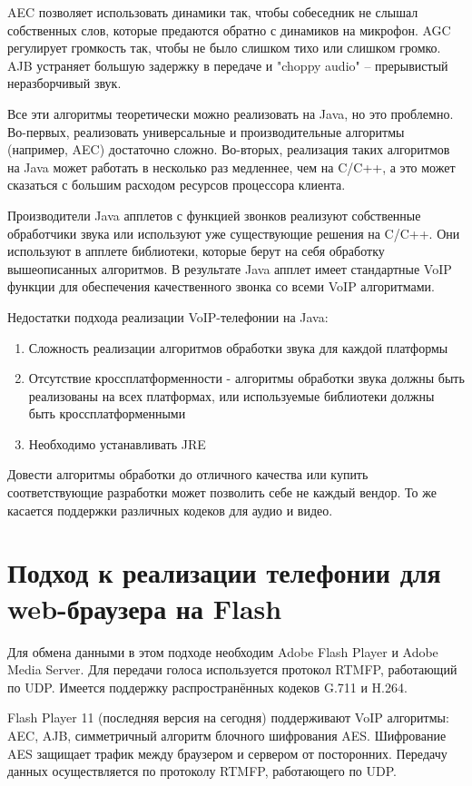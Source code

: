 AEC позволяет использовать динамики так, чтобы собеседник не слышал собственных слов, которые предаются обратно с динамиков на микрофон. AGC регулирует громкость так, чтобы не было слишком тихо или слишком громко. AJB устраняет большую задержку в передаче и "choppy audio" – прерывистый неразборчивый звук.

Все эти алгоритмы теоретически можно реализовать на Java, но это проблемно. Во-первых, реализовать универсальные и производительные алгоритмы (например, AEC) достаточно сложно. Во-вторых, реализация таких алгоритмов на Java может работать в несколько раз медленнее, чем на C/C++, а это может сказаться с большим расходом ресурсов процессора клиента.

Производители Java апплетов с функцией звонков реализуют собственные обработчики звука или используют уже существующие решения на C/C++. Они используют в апплете библиотеки, которые берут на себя обработку вышеописанных алгоритмов. В результате Java апплет имеет стандартные VoIP функции для обеспечения качественного звонка со всеми VoIP алгоритмами.

Недостатки подхода реализации VoIP-телефонии на Java:
\begin{enumerate}
\item Сложность реализации алгоритмов обработки звука для каждой платформы
\item Отсутствие кроссплатформенности - алгоритмы обработки звука должны быть реализованы на всех платформах, или используемые библиотеки должны быть кроссплатформенными
\item Необходимо устанавливать JRE
\end{enumerate}

Довести алгоритмы обработки до отличного качества или купить соответствующие разработки может позволить себе не каждый вендор. То же касается поддержки различных кодеков для аудио и видео.

\section{Подход к реализации телефонии для web-браузера на Flash}

Для обмена данными в этом подходе необходим Adobe Flash Player и Adobe Media Server. Для передачи голоса используется протокол RTMFP, работающий по UDP. Имеется поддержку распространённых кодеков G.711 и H.264.

Flash Player 11 (последняя версия на сегодня) поддерживают VoIP алгоритмы: AEC, AJB, симметричный алгоритм блочного шифрования AES. Шифрование AES защищает трафик между браузером и сервером от посторонних. Передачу данных осуществляется по протоколу RTMFP, работающего по UDP.\cite{adobe}

